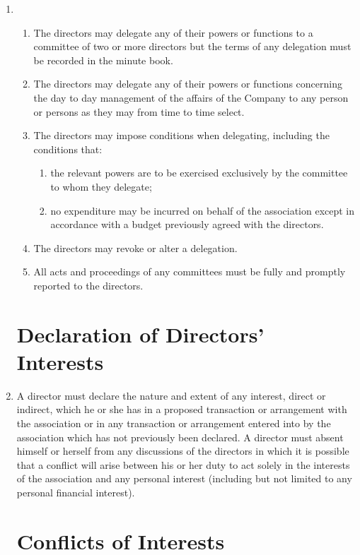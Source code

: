 \begin{enumerate}
\item
  \begin{enumerate}
  \item
    The directors may delegate any of their powers or functions to a
    committee of two or more directors but the terms of any delegation
    must be recorded in the minute book.
  \item
      The directors may delegate any of their powers or functions concerning the day
      to day management of the affairs of the Company to any person or persons as they may
      from time to time select.
  \item
    The directors may impose conditions when delegating, including the
    conditions that:
    \begin{enumerate}
    \item
      the relevant powers are to be exercised exclusively by the
      committee to whom they delegate;
    \item
      no expenditure may be incurred on behalf of the association except in
      accordance with a budget previously agreed with the directors.
    \end{enumerate}
  \item
    The directors may revoke or alter a delegation.
  \item
    All acts and proceedings of any committees must be fully and
    promptly reported to the directors.
  \end{enumerate}

\section{Declaration of Directors' Interests}

\item\label{directors-interests}
  A director must declare the nature and extent of any interest,
  direct or indirect, which he or she has in a proposed transaction
  or arrangement with the association or in any transaction or
  arrangement entered into by the association which has not previously
  been declared. A director must absent himself or herself from any
  discussions of the directors in which it is possible that a
  conflict will arise between his or her duty to act solely in the
      interests of the association and any personal interest (including but
  not limited to any personal financial interest).

\section{Conflicts of Interests}


\end{enumerate}
